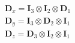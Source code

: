 \begin{subequations}
\begin{eqnarray}
     \mathbf{D}_x = \mathbf{I}_3 \otimes \mathbf{I}_2 \otimes\mathbf{D}_1 \\
     \mathbf{D}_y = \mathbf{I}_3 \otimes \mathbf{D}_2 \otimes\mathbf{I}_1 \\
     \mathbf{D}_z = \mathbf{D}_3 \otimes \mathbf{I}_2 \otimes\mathbf{I}_1 \\
\end{eqnarray}
\end{subequations}
